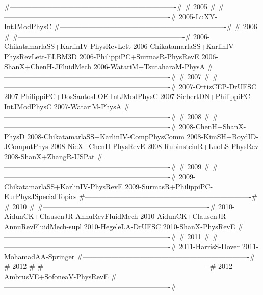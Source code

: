 #----------------------------------------------------------------------#
#                                 2005                                 #
#----------------------------------------------------------------------#
2005-LuXY-IntJModPhysC
#----------------------------------------------------------------------#
#                                 2006                                 #
#----------------------------------------------------------------------#
2006-ChikatamarlaSS+KarlinIV-PhysRevLett
2006-ChikatamarlaSS+KarlinIV-PhysRevLett-ELBM3D
2006-PhilippiPC+SurmasR-PhysRevE
2006-ShanX+ChenH-JFluidMech
2006-WatariM+TsutaharaM-PhysA
#----------------------------------------------------------------------#
#                                 2007                                 #
#----------------------------------------------------------------------#
2007-OrtizCEP-DrUFSC
2007-PhilippiPC+DosSantosLOE-IntJModPhysC
2007-SiebertDN+PhilippiPC-IntJModPhysC
2007-WatariM-PhysA
#----------------------------------------------------------------------#
#                                 2008                                 #
#----------------------------------------------------------------------#
2008-ChenH+ShanX-PhysD
2008-ChikatamarlaSS+KarlinIV-CompPhysComm
2008-KimSH+BoydID-JComputPhys
2008-NieX+ChenH-PhysRevE
2008-RubinsteinR+LuoLS-PhysRev
2008-ShanX+ZhangR-USPat
#----------------------------------------------------------------------#
#                                 2009                                 #
#----------------------------------------------------------------------#
2009-ChikatamarlaSS+KarlinIV-PhysRevE
2009-SurmasR+PhilippiPC-EurPhysJSpecialTopics
#----------------------------------------------------------------------#
#                                 2010                                 #
#----------------------------------------------------------------------#
2010-AidunCK+ClausenJR-AnnuRevFluidMech
2010-AidunCK+ClausenJR-AnnuRevFluidMech-supl
2010-HegeleLA-DrUFSC
2010-ShanX-PhysRevE
#----------------------------------------------------------------------#
#                                 2011                                 #
#----------------------------------------------------------------------#
2011-HarrisS-Dover
2011-MohamadAA-Springer
#----------------------------------------------------------------------#
#                                 2012                                 #
#----------------------------------------------------------------------#
2012-AmbrusVE+SofoneaV-PhysRevE
#----------------------------------------------------------------------#
